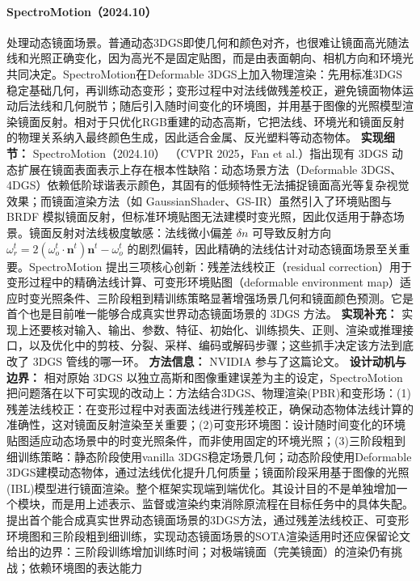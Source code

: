 \paragraph{SpectroMotion（2024.10）\cite{2410_17249}}
处理动态镜面场景。普通动态3DGS即使几何和颜色对齐，也很难让镜面高光随法线和光照正确变化，因为高光不是固定贴图，而是由表面朝向、相机方向和环境光共同决定。SpectroMotion在Deformable 3DGS上加入物理渲染：先用标准3DGS稳定基础几何，再训练动态变形；变形过程中对法线做残差校正，避免镜面物体运动后法线和几何脱节；随后引入随时间变化的环境图，并用基于图像的光照模型渲染镜面反射。相对于只优化RGB重建的动态高斯，它把法线、环境光和镜面反射的物理关系纳入最终颜色生成，因此适合金属、反光塑料等动态物体。
\textbf{实现细节：} SpectroMotion（2024.10） （CVPR 2025，Fan et al.）指出现有 3DGS 动态扩展在镜面表面表示上存在根本性缺陷：动态场景方法（Deformable 3DGS、4DGS）依赖低阶球谐表示颜色，其固有的低频特性无法捕捉镜面高光等复杂视觉效果；而镜面渲染方法（如 GaussianShader、GS-IR）虽然引入了环境贴图与 BRDF 模拟镜面反射，但标准环境贴图无法建模时变光照，因此仅适用于静态场景。镜面反射对法线极度敏感：法线微小偏差 $\delta n$ 可导致反射方向 $\omega_r^t = 2(\omega_o^t \cdot \mathbf{n}^t)\mathbf{n}^t - \omega_o^t$ 的剧烈偏转，因此精确的法线估计对动态镜面场景至关重要。SpectroMotion 提出三项核心创新：残差法线校正（residual correction）用于变形过程中的精确法线计算、可变形环境贴图（deformable environment map）适应时变光照条件、三阶段粗到精训练策略显著增强场景几何和镜面颜色预测。它是首个也是目前唯一能够合成真实世界动态镜面场景的 3DGS 方法。
\textbf{实现补充：} 实现上还要核对输入、输出、参数、特征、初始化、训练损失、正则、渲染或推理接口，以及优化中的剪枝、分裂、采样、编码或解码步骤；这些抓手决定该方法到底改了 3DGS 管线的哪一环。
\textbf{方法信息：} NVIDIA 参与了这篇论文。
\textbf{设计动机与边界：} 相对原始 3DGS 以独立高斯和图像重建误差为主的设定，SpectroMotion 把问题落在以下可实现的改动上：方法结合3DGS、物理渲染(PBR)和变形场：(1)残差法线校正：在变形过程中对表面法线进行残差校正，确保动态物体法线计算的准确性，这对镜面反射渲染至关重要；(2)可变形环境图：设计随时间变化的环境贴图适应动态场景中的时变光照条件，而非使用固定的环境光照；(3)三阶段粗到细训练策略：静态阶段使用vanilla 3DGS稳定场景几何；动态阶段使用Deformable 3DGS建模动态物体，通过法线优化提升几何质量；镜面阶段采用基于图像的光照(IBL)模型进行镜面渲染。整个框架实现端到端优化。其设计目的不是单独增加一个模块，而是用上述表示、监督或渲染约束消除原流程在目标任务中的具体失配。提出首个能合成真实世界动态镜面场景的3DGS方法，通过残差法线校正、可变形环境图和三阶段粗到细训练，实现动态镜面场景的SOTA渲染适用时还应保留论文给出的边界：三阶段训练增加训练时间；对极端镜面（完美镜面）的渲染仍有挑战；依赖环境图的表达能力
